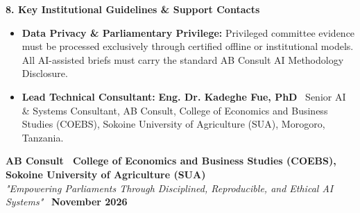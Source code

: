 \documentclass[10pt, a4paper]{article}
\begin{document}
\vspace{-0.15cm}
\noindent\textbf{\textcolor{tanzaniablue}{\large 8. Key Institutional Guidelines \& Support Contacts}}
\vspace{0.1cm}
\begin{itemize}
    \item \textbf{Data Privacy \& Parliamentary Privilege:} Privileged committee evidence must be processed exclusively through certified offline or institutional models. All AI-assisted briefs must carry the standard AB Consult AI Methodology Disclosure.
    \item \textbf{Lead Technical Consultant:} \textbf{Eng. Dr. Kadeghe Fue, PhD} \textbullet\ Senior AI \& Systems Consultant, AB Consult, College of Economics and Business Studies (COEBS), Sokoine University of Agriculture (SUA), Morogoro, Tanzania.
\end{itemize}

\vspace{0.2cm}
\begin{center}
    \footnotesize\textbf{AB Consult \textbullet\ College of Economics and Business Studies (COEBS), Sokoine University of Agriculture (SUA)}\\
    \textit{"Empowering Parliaments Through Disciplined, Reproducible, and Ethical AI Systems"} \textbullet\ \textbf{November 2026}
\end{center}
\end{document}
